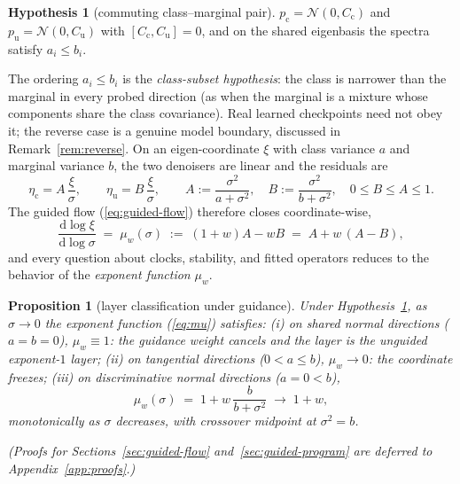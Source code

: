 \documentclass{article} %
\def\eqref#1{equation~\ref{#1}}
\theoremstyle{plain}
\newtheorem{proposition}{Proposition}
\theoremstyle{definition}
\newtheorem{hypothesis}{Hypothesis}
\theoremstyle{remark}
\providecommand{\dd}{\mathrm{d}}
\providecommand{\etac}{\eta_{\mathrm{c}}}
\providecommand{\etau}{\eta_{\mathrm{u}}}
\def\eqref#1{(\ref{#1})}
\newif\ifarxiv
\begin{document}
\begin{hypothesis}[commuting class--marginal pair]\label{hyp:commuting}
$p_{\mathrm c} = \mathcal N(0, C_{\mathrm c})$ and $p_{\mathrm u} =
\mathcal N(0, C_{\mathrm u})$ with $[C_{\mathrm c}, C_{\mathrm u}] = 0$,
and on the shared eigenbasis the spectra satisfy $a_i \le b_i$.
\end{hypothesis}

The ordering $a_i \le b_i$ is the \emph{class-subset hypothesis}: the class
is narrower than the marginal in every probed direction (as when the
marginal is a mixture whose components share the class covariance). Real
learned checkpoints need not obey it; the reverse case is a genuine model
boundary, discussed in Remark~\ref{rem:reverse}. On an eigen-coordinate
$\xi$ with class variance
$a$ and marginal variance $b$, the two denoisers are linear and the
residuals are
\begin{equation}\label{eq:AB}
  \etac = A\,\frac{\xi}{\sigma}, \qquad
  \etau = B\,\frac{\xi}{\sigma}, \qquad
  A := \frac{\sigma^2}{a+\sigma^2}, \quad
  B := \frac{\sigma^2}{b+\sigma^2}, \quad
  0 \le B \le A \le 1 .
\end{equation}
The guided flow \eqref{eq:guided-flow} therefore closes coordinate-wise,
\begin{equation}\label{eq:mu}
  \frac{\dd \log \xi}{\dd \log \sigma}
  \;=\; \mu_w(\sigma)
  \;:=\; (1+w)A - wB
  \;=\; A + w\,(A - B),
\end{equation}
and every question about clocks, stability, and fitted operators reduces to
the behavior of the \emph{exponent function} $\mu_w$.

\begin{proposition}[layer classification under guidance]\label{prop:glayers}
Under Hypothesis~\ref{hyp:commuting}, as $\sigma \to 0$ the exponent
function \eqref{eq:mu} satisfies:
(i) on shared normal directions ($a = b = 0$), $\mu_w \equiv 1$: the
guidance weight cancels and the layer is the unguided exponent-$1$
layer;
(ii) on tangential directions ($0 < a \le b$), $\mu_w \to 0$: the
coordinate freezes;
(iii) on \emph{discriminative normal} directions ($a = 0 < b$),
\begin{equation}\label{eq:crossover}
  \mu_w(\sigma) \;=\; 1 + w\,\frac{b}{b+\sigma^2}
  \;\longrightarrow\; 1+w ,
\end{equation}
monotonically as $\sigma$ decreases, with crossover midpoint at
$\sigma^2 = b$.
\end{proposition}

\newcommand{\ProofGLayers}{%
For $a=0$ one has $A \equiv 1$, so $\mu_w = (1+w) - wB = 1 +
w(1-B) = 1 + wb/(b+\sigma^2)$; the limits and monotonicity are immediate.
Cases (i) and (ii) follow from $A, B \to 1$ and $A, B \to 0$ respectively.
}
\ifarxiv\begin{proof}\ProofGLayers\end{proof}\else\noindent\emph{(Proofs
for Sections~\ref{sec:guided-flow} and~\ref{sec:guided-program} are
deferred to Appendix~\ref{app:proofs}.)}\fi
\end{document}
